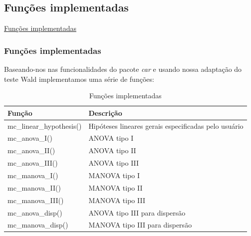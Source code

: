 \documentclass[10pt,
  aspectratio=169,
  serif,
  mathserif,
  professionalfont,
  compress,
  handout,
  ]{beamer}\usepackage[]{graphicx}\usepackage[]{color}
\begin{document}

\subsection{Funções implementadas}


\begin{frame}[c, allowframebreaks]

\begin{center}

  {\normalsize \href{https://lineu96.github.io/st/}{Funções implementadas}}
  
\end{center}

\end{frame}


\begin{frame}
  \frametitle{Funções implementadas}

Baseando-nos nas funcionalidades do pacote \emph{car} \cite{car} e usando nossa adaptação do teste Wald implementamos uma série de funções:


\begin{table}[h]
\centering
\begin{tabular}{ll}
\hline
Função                   & Descrição \\ 
\hline

mc\_linear\_hypothesis() & Hipóteses lineares gerais especificadas pelo usuário \\

mc\_anova\_I()           & ANOVA  tipo I \\
mc\_anova\_II()          & ANOVA  tipo II \\
mc\_anova\_III()         & ANOVA  tipo III \\

mc\_manova\_I()          & MANOVA tipo I \\
mc\_manova\_II()         & MANOVA tipo II \\
mc\_manova\_III()        & MANOVA tipo III \\

mc\_anova\_disp()        & ANOVA  tipo III para dispersão \\
mc\_manova\_disp()       & MANOVA tipo III para dispersão \\

\hline
\end{tabular}
\caption{Funções implementadas}
\label{tab:funcoes}
\end{table}

\end{frame}
\end{document}
